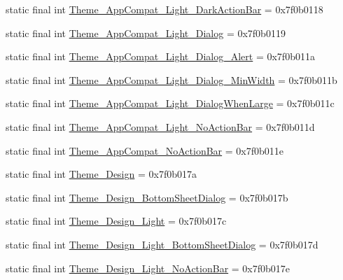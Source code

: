 \begin{CompactItemize}
\item 
static final int \hyperlink{classandroid_1_1support_1_1transition_1_1_r_1_1style_044896e86cbcc0ca4080e99a69f2d0e5}{Theme\_\-AppCompat\_\-Light\_\-DarkActionBar} = 0x7f0b0118
\item 
static final int \hyperlink{classandroid_1_1support_1_1transition_1_1_r_1_1style_1f810fb210aedcac70f45d21b5162659}{Theme\_\-AppCompat\_\-Light\_\-Dialog} = 0x7f0b0119
\item 
static final int \hyperlink{classandroid_1_1support_1_1transition_1_1_r_1_1style_4e2498ee1ad64d6d76a2a5001231cd06}{Theme\_\-AppCompat\_\-Light\_\-Dialog\_\-Alert} = 0x7f0b011a
\item 
static final int \hyperlink{classandroid_1_1support_1_1transition_1_1_r_1_1style_6b4f40c004468117218ead8b46dc3870}{Theme\_\-AppCompat\_\-Light\_\-Dialog\_\-MinWidth} = 0x7f0b011b
\item 
static final int \hyperlink{classandroid_1_1support_1_1transition_1_1_r_1_1style_d9043d71c0c6b0999656b9625f683ae2}{Theme\_\-AppCompat\_\-Light\_\-DialogWhenLarge} = 0x7f0b011c
\item 
static final int \hyperlink{classandroid_1_1support_1_1transition_1_1_r_1_1style_f1b2251e5cb460fd0da6888021f2dbbf}{Theme\_\-AppCompat\_\-Light\_\-NoActionBar} = 0x7f0b011d
\item 
static final int \hyperlink{classandroid_1_1support_1_1transition_1_1_r_1_1style_37d8dc45fb03cf2b960f9a2018a07106}{Theme\_\-AppCompat\_\-NoActionBar} = 0x7f0b011e
\item 
static final int \hyperlink{classandroid_1_1support_1_1transition_1_1_r_1_1style_eb413a7b65c55983cddcfd8f7be3a574}{Theme\_\-Design} = 0x7f0b017a
\item 
static final int \hyperlink{classandroid_1_1support_1_1transition_1_1_r_1_1style_5667c0c9bf0f129718b993df97031d4f}{Theme\_\-Design\_\-BottomSheetDialog} = 0x7f0b017b
\item 
static final int \hyperlink{classandroid_1_1support_1_1transition_1_1_r_1_1style_6eaa2642e85a0bad0fd1248830c7e8d1}{Theme\_\-Design\_\-Light} = 0x7f0b017c
\item 
static final int \hyperlink{classandroid_1_1support_1_1transition_1_1_r_1_1style_3c2c4df0873d299148e67e79d984dfa1}{Theme\_\-Design\_\-Light\_\-BottomSheetDialog} = 0x7f0b017d
\item 
static final int \hyperlink{classandroid_1_1support_1_1transition_1_1_r_1_1style_a1b586e259326105f9865196c1b125be}{Theme\_\-Design\_\-Light\_\-NoActionBar} = 0x7f0b017e
\item 

\end{CompactItemize}
